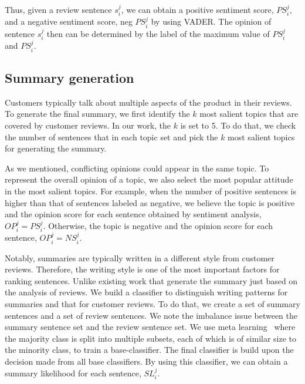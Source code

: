 \documentclass[letterpaper]{article}
\begin{document}
Thus, given a review sentence $s_i^j$, we can obtain a positive sentiment score, $PS_i^j$, and a negative sentiment score, neg $PS_i^j$ by using VADER. The opinion of sentence $s_i^j$ then can be determined by the label of the maximum value of  $PS_i^j$ and $PS_i^j$. 

\subsection{Summary generation}
Customers typically talk about multiple aspects of the product in their reviews. To generate the final summary, we first identify the $k$ most salient topics that are covered by customer reviews. In our work, the $k$ is set to 5. 
To do that, we check the number of sentences that in each topic set and pick the $k$ most salient topics for generating the summary.

As we mentioned, conflicting opinions could appear in the same topic. To represent the overall opinion of a topic, we also select the most popular attitude in the most salient topics. For example, when the number of positive sentences is higher than that of sentences labeled as negative, we believe the topic is positive and the opinion score for each sentence obtained by sentiment analysis, $OP_i^j = PS_i^j$. Otherwise, the topic is negative and the opinion score for each sentence, $OP_i^j = NS_i^j$. 

Notably, summaries are typically written in a different style from customer reviews. Therefore, the writing style is one of the most important factors for ranking sentences.
Unlike existing work that generate the summary just based on the analysis of reviews. We build a classifier to distinguish writing patterns for summaries and that for customer reviews. To do that, we create a set of summary sentences and a set of review sentences. We note the imbalance issue between the summary sentence set and the review sentence set. We use meta learning~\cite{Chan1998Toward} where the majority class is split into multiple subsets, each of which is of similar size to the minority class, to train a base-classifier. The final classifier is build upon the decision made from all base classifiers. By using this classifier, we can obtain a summary likelihood for each sentence, $SL_i^j$.
\end{document}
